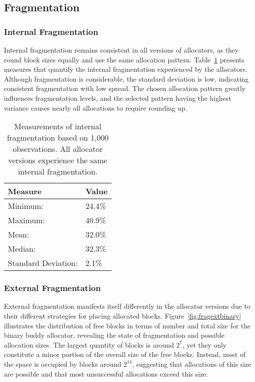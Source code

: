 \FloatBarrier
\subsection{Fragmentation}
\subsubsection{Internal Fragmentation}
Internal fragmentation remains consistent in all versions of allocators, as they round block sizes equally and use the same allocation pattern. Table~\ref{table:fraginternal} presents measures that quantify the internal fragmentation experienced by the allocators. Although fragmentation is considerable, the standard deviation is low, indicating consistent fragmentation with low spread. The chosen allocation pattern greatly influences fragmentation levels, and the selected pattern having the highest variance causes nearly all allocations to require rounding up.

\begin{table}[h]
    \begin{tabular}{|l|l|}
        \hline
        \textbf{Measure}    & \textbf{Value} \\ \hline
        Minimum:            & 24.4\%         \\ \hline
        Maximum:            & 40.9\%         \\ \hline
        Mean:               & 32.0\%         \\ \hline
        Median:             & 32.3\%         \\ \hline
        Standard Deviation: & 2.1\%          \\ \hline
    \end{tabular}
    \centering
    \caption{Measurements of internal fragmentation based on 1,000 observations. All allocator versions experience the same internal fragmentation.}
    \label{table:fraginternal}
\end{table}

\subsubsection{External Fragmentation}
External fragmentation manifests itself differently in the allocator versions due to their different strategies for placing allocated blocks. Figure~\ref{fig:fragextbinary} illustrates the distribution of free blocks in terms of number and total size for the binary buddy allocator, revealing the state of fragmentation and possible allocation sizes. The largest quantity of blocks is around $2^7$, yet they only constitute a minor portion of the overall size of the free blocks. Instead, most of the space is occupied by blocks around $2^{14}$, suggesting that allocations of this size are possible and that most unsuccessful allocations exceed this size.

